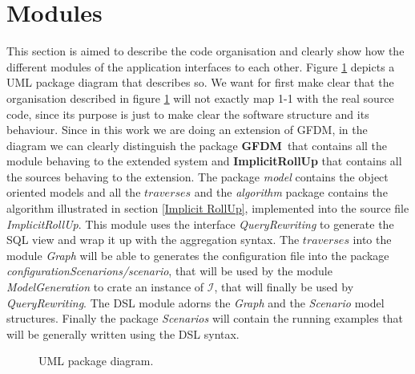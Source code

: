 \documentclass[12pt,a4paper]{report}
\newcommand\systemName{GFDM}
\newcommand\integrationGraph{\mathcal{I}}
\begin{document}
\section{Modules}
This section is aimed to describe the code organisation and clearly show how the different modules of the application interfaces to each other.
%
Figure \ref{fig:Package} depicts a UML package diagram that describes so.
%
We want for first make clear that the organisation described in figure \ref{fig:Package} will not exactly map 1-1 with the real source code, since its purpose is just to make clear the software structure and its behaviour.
%
Since in this work we are doing an extension of \systemName, in the diagram we can clearly distinguish the package \textbf{\systemName}\, that contains all the module behaving to the extended system and \textbf{ImplicitRollUp} that contains all the sources behaving to the extension.
%
The package \textit{model} contains the object oriented models and all the $traverses$ and the \textit{algorithm} package contains the algorithm illustrated in section \ref{Implicit RollUp}, implemented into the source file \textit{ImplicitRollUp}.
%
This module uses the interface \textit{QueryRewriting} to generate the SQL view and wrap it up with the aggregation syntax.
%
The $traverses$ into the module \textit{Graph} will be able to generates the configuration file into the package \textit{configurationScenarions/scenario}, that will be used by the module \textit{ModelGeneration} to crate an instance of $\integrationGraph$, that will finally be used by \textit{QueryRewriting}.
%
The DSL module adorns the \textit{Graph} and the \textit{Scenario} model structures.
%
Finally the package \textit{Scenarios} will contain the running examples that will be generally written using the DSL syntax.
%
\begin{figure} [ht]
    \caption{UML package diagram.}
    \label{fig:Package}
\end{figure}
%
\end{document}
